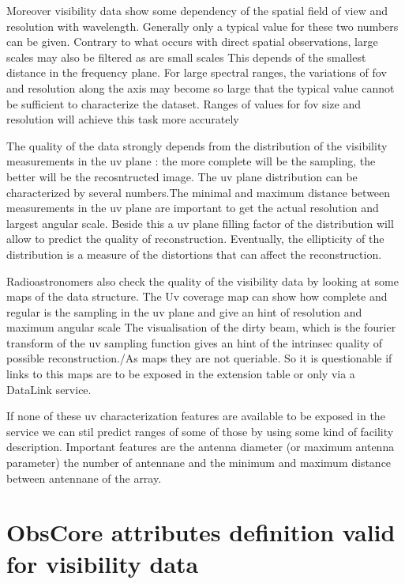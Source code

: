 \documentclass[11pt,a4paper]{ivoa}
\begin{document}
    Moreover visibility data show some dependency of the spatial field of view and resolution with wavelength. Generally only a typical value for these two numbers can be given. 
    Contrary to what occurs with direct spatial observations, large scales may also be filtered as are small scales This depends of the smallest distance in the frequency plane.
    For large spectral ranges, the variations of fov and resolution along the axis may become so large that the typical value cannot be sufficient to characterize the dataset. 
    Ranges of values for fov size and resolution will achieve this task more accurately

     The quality of the data strongly depends from the distribution of the visibility measurements in the uv plane : the more complete will be the sampling, the better will be the recosntructed image. The uv plane distribution can be characterized by several numbers.The minimal and maximum distance between measurements in the uv plane are important to get the actual resolution and largest angular scale. Beside this a uv plane filling factor of the distribution  will allow to predict the quality of reconstruction.
          Eventually, the ellipticity of the distribution is a measure of the distortions that can affect the reconstruction.
          
          Radioastronomers also check the quality of the visibility data by looking at some maps  of the data structure.           The Uv coverage map can show how complete and regular is the sampling in the uv plane and give an hint of resolution and maximum angular scale
The visualisation of the dirty beam, which is the fourier transform of the uv sampling function gives an hint of the intrinsec quality of possible reconstruction./As maps they are not queriable. So it is questionable if links to this maps are to be exposed in the extension table or only via a DataLink service. 
          
          If none of these uv characterization features are available to be exposed in the service we can stil predict ranges of some of those by using some kind of facility description.  
          Important features are the antenna diameter (or maximum antenna parameter) the number of antennane and the minimum and maximum distance between antennane of the array.
          
           



\section{ObsCore attributes definition valid for visibility data}
\label{sec:ObsCoreVisDef}
\end{document}
